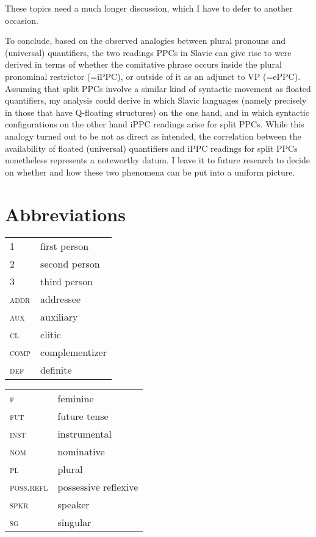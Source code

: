\documentclass[output=paper,colorlinks,citecolor=brown]{langscibook}
\begin{document}
\noindent These topics need a much longer discussion, which I have to defer to another occasion. 


To conclude, based on the observed analogies between plural pronouns and (universal) quantifiers, the two readings PPCs in Slavic can give rise to were derived in terms of whether the comitative phrase occurs inside the plural pronominal restrictor (=iPPC), or outside of it as an adjunct to VP (=ePPC). Assuming that split PPCs involve a similar kind of syntactic movement as floated quantifiers, my analysis could derive in which Slavic languages (namely precisely in those that have Q-floating structures) on the one hand, and in which syntactic configurations on the other hand iPPC readings arise for split PPCs. While this analogy turned out to be not as direct as intended, the correlation between the availability of floated (universal) quantifiers and iPPC readings for split PPCs nonetheless represents a noteworthy datum. I leave it to future research to decide on whether and how these two phenomena can be put into a uniform picture. 



\section*{Abbreviations}

\begin{tabularx}{.5\textwidth}{@{}lQ}
\textsc{1}&first person\\
\textsc{2}&second person\\
\textsc{3}&third person\\
\textsc{addr}&addressee\\
\textsc{aux}&auxiliary\\
\textsc{cl}&clitic\\
\textsc{comp}&complementizer\\
\textsc{def}&definite\\
\end{tabularx}%
\begin{tabularx}{.5\textwidth}{lQ@{}}
\textsc{f}&feminine\\
\textsc{fut}&future tense\\
\textsc{inst}&instrumental\\
\textsc{nom}&nominative\\
\textsc{pl}&plural\\
\textsc{poss.refl}&possessive reflexive\\
\textsc{spkr}&speaker\\
\textsc{sg}&singular
\end{tabularx}
\end{document}
